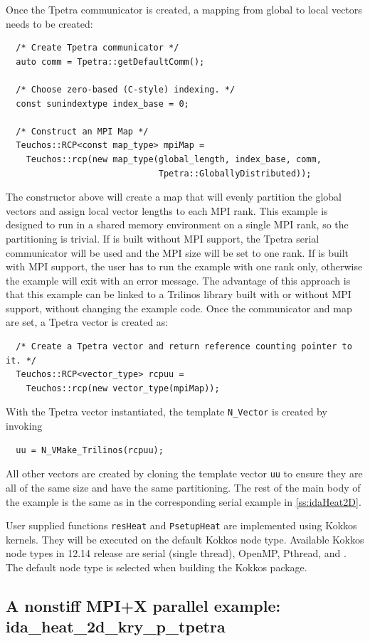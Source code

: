 Once the Tpetra communicator is created, a mapping from global to local vectors
needs to be created:
\begin{verbatim}
  /* Create Tpetra communicator */
  auto comm = Tpetra::getDefaultComm();

  /* Choose zero-based (C-style) indexing. */
  const sunindextype index_base = 0;

  /* Construct an MPI Map */
  Teuchos::RCP<const map_type> mpiMap =
    Teuchos::rcp(new map_type(global_length, index_base, comm,
                              Tpetra::GloballyDistributed));
\end{verbatim}
The constructor above will create a map that will evenly partition the global vectors
and assign local vector lengths to each MPI rank. This example is designed to
run in a shared memory environment on a single MPI rank, so the partitioning is trivial.
If {\trilinos} is built without MPI support, the Tpetra serial
communicator will be used and the MPI size will be set to one rank. If {\trilinos} is built
with MPI support, the user has to run the example with one rank only, otherwise the example
will exit with an error message. The advantage of this approach is that
this example can be linked to a Trilinos library built with or without MPI support, without
changing the example code. 
Once the communicator and map are set, a Tpetra vector is created as:
\begin{verbatim}
  /* Create a Tpetra vector and return reference counting pointer to it. */
  Teuchos::RCP<vector_type> rcpuu =
    Teuchos::rcp(new vector_type(mpiMap));
\end{verbatim}
With the Tpetra vector instantiated, the template \verb|N_Vector| is created by 
invoking
\begin{verbatim}
  uu = N_VMake_Trilinos(rcpuu);
\end{verbatim}
All other vectors are created by cloning the template vector \verb|uu| to
ensure they are all of the same size and have the same partitioning. The
rest of the main body of the example is the same as in the corresponding
serial example in \ref{ss:idaHeat2D}.

User supplied functions \verb|resHeat| and \verb|PsetupHeat| are implemented
using Kokkos kernels. They will be executed on the default Kokkos node type.
Available Kokkos node types in {\trilinos} 12.14 release are serial (single thread),
OpenMP, Pthread, and {\cuda}. The default node type is selected when building
the Kokkos package.


\subsection{A nonstiff MPI+X parallel example: ida\_heat\_2d\_kry\_p\_tpetra}
\label{ss:ida_heat_2d_kry_p_tpetra}

